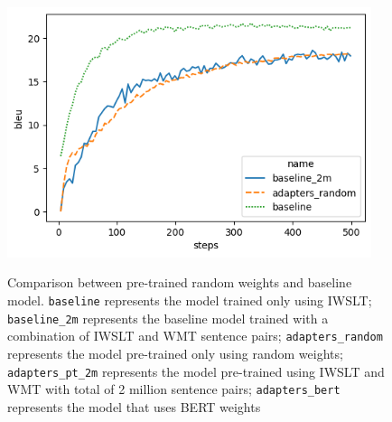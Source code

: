 \begin{figure}[h]
    {\includegraphics[width=0.95\textwidth]{img/random.png}}
    \centering
    \caption[Comparison between pre-trained random weights and baseline model.]{Comparison between pre-trained random weights and baseline model. \texttt{baseline} represents the model trained only using IWSLT; \texttt{baseline\_2m} represents the baseline model trained with a combination of IWSLT and WMT sentence pairs; \texttt{adapters\_random} represents the model pre-trained only using random weights; \texttt{adapters\_pt\_2m} represents the model pre-trained using IWSLT and WMT with total of 2 million sentence pairs; \texttt{adapters\_bert} represents the model that uses BERT weights}
    \label{img:rndbslcmp}
\end{figure}

